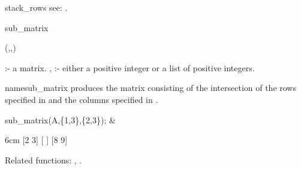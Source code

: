 \begin{Operator}{stack_rows}
see:  .
\end{Operator}


\begin{Operator}{sub_matrix}

\begin{Syntax}
(,,)
\end{Syntax}

                         :- a matrix. 
,  :- either a positive integer or a
                                         list of positive integers.

name{sub\_matrix} produces the matrix consisting of the intersection of
the rows specified in  and the columns specified in 
. 


\begin{Examples}

sub_matrix(A,\{1,3\},\{2,3\}); &
\begin{multilineoutput}{6cm}
[2  3]
[    ]
[8  9]
\end{multilineoutput}

\end{Examples}

Related functions:
, .

\end{Operator}


